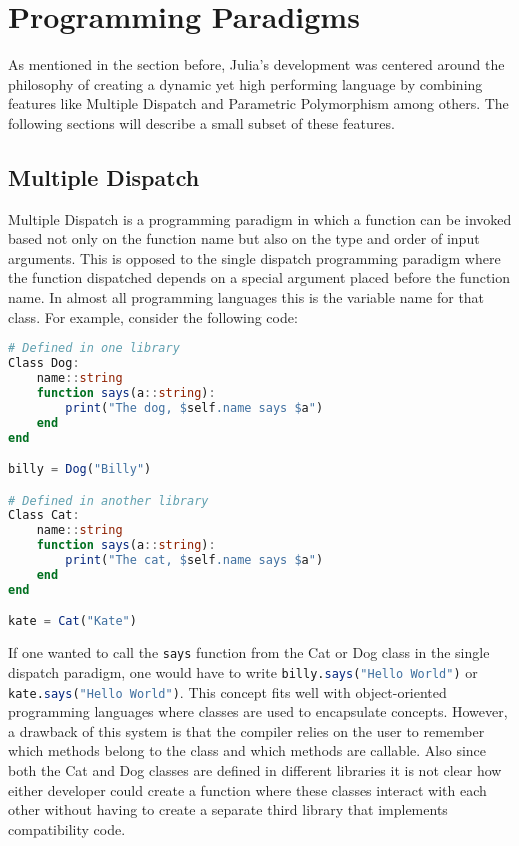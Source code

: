 \setcounter{chapter}{2}
\setcounter{section}{0}
\setcounter{subsection}{0}
\chapter*{Programming Paradigms}
As mentioned in the section before, Julia's development was centered around the philosophy of creating a dynamic yet high
performing language by combining features like Multiple Dispatch and Parametric Polymorphism among others. The following
sections will describe a small subset of these features.

\section{Multiple Dispatch}
Multiple Dispatch is a programming paradigm in which a function can be invoked based not only on the function name but
also on the type and order of input arguments. This is opposed to the single dispatch programming paradigm where the
function dispatched depends on a special argument placed before the function name. In almost all programming languages
this is the variable name for that class. For example, consider the following code: \hfill
\begin{lstlisting}[language=Julia]
# Defined in one library
Class Dog:
    name::string
    function says(a::string):
        print("The dog, $self.name says $a")
    end
end

billy = Dog("Billy")

# Defined in another library
Class Cat:
    name::string
    function says(a::string):
        print("The cat, $self.name says $a")
    end
end

kate = Cat("Kate")
\end{lstlisting}
If one wanted to call the \lstinline[language=Julia]{says} function from the Cat or Dog class in the single dispatch
paradigm, one would have to write \lstinline[language=Julia]{billy.says("Hello World")} or
\lstinline[language=Julia]{kate.says("Hello World")}. This concept fits well with object-oriented programming languages
where classes are used to encapsulate concepts. However, a drawback of this system is that the compiler relies on the
user to remember which methods belong to the class and which methods are callable. Also since both the Cat and Dog
classes are defined in different libraries it is not clear how either developer could create a function where these
classes interact with each other without having to create a separate third library that implements compatibility code.

